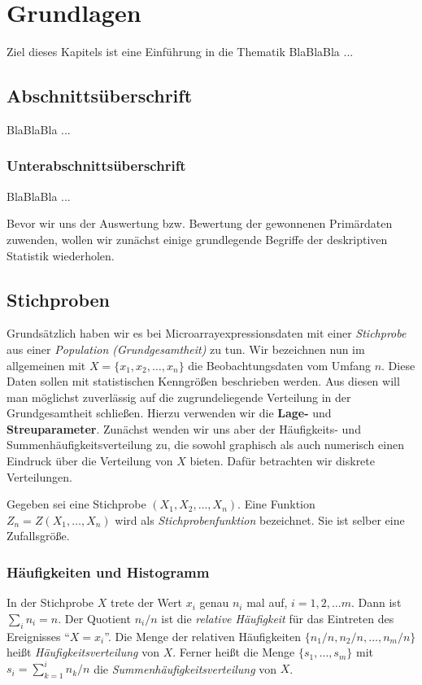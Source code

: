 
\chapter{Grundlagen}
  \label{Grundlagen}

Ziel dieses Kapitels ist eine Einführung in die Thematik BlaBlaBla ...

\section{Abschnittsüberschrift}
  \label{Abschnittslabel} 

BlaBlaBla ...

\subsection{Unterabschnittsüberschrift}
  \label{Unterabschnittslabel}

BlaBlaBla ...


Bevor wir uns der Auswertung bzw. Bewertung der gewonnenen Primärdaten zuwenden, wollen wir zunächst einige grundlegende Begriffe der deskriptiven Statistik wiederholen.
\section{Stichproben}

Grundsätzlich haben wir es bei Microarrayexpressionsdaten mit einer {\em Stichprobe} aus einer {\em Population (Grundgesamtheit)} zu tun.   
Wir bezeichnen nun im allgemeinen mit $X=\{x_1,x_2,\ldots,x_n\}$ die Beobachtungsdaten vom Umfang $n$. 
Diese Daten sollen mit statistischen Kenngrößen beschrieben werden. Aus diesen will man möglichst zuverlässig auf die zugrundeliegende Verteilung in der Grundgesamtheit schließen. Hierzu verwenden wir die {\bf Lage-} und {\bf Streuparameter}. Zunächst wenden wir uns aber der Häufigkeits- und Summenhäufigkeitsverteilung zu, die sowohl graphisch als auch numerisch einen Eindruck über die Verteilung von $X$ bieten. Dafür betrachten wir diskrete Verteilungen.

Gegeben sei eine Stichprobe $(X_1,X_2,\ldots,X_n)$. Eine Funktion $Z_n=Z(X_1,\ldots,X_n)$ wird als {\em Stichprobenfunktion} bezeichnet. Sie ist selber eine Zufallsgröße.

\subsection{Häufigkeiten und Histogramm}
In der Stichprobe $X$ trete der Wert $x_i$ genau $n_i$ mal auf, $i=1,2,\ldots m$. Dann ist $\sum_i n_i = n$. Der Quotient $n_i/n$ ist die {\em relative Häufigkeit} für das Eintreten des Ereignisses ``$X=x_i$''.
Die Menge der relativen Häufigkeiten $\{n_1/n,n_2/n,\ldots, n_m/n\}$ heißt {\em Häufigkeitsverteilung} von $X$. Ferner heißt die Menge $\{s_1,\ldots,s_m\}$ mit $s_i=\sum_{k=1}^{i}n_k/n$ die {\em Summenhäufigkeitsverteilung} von $X$.

